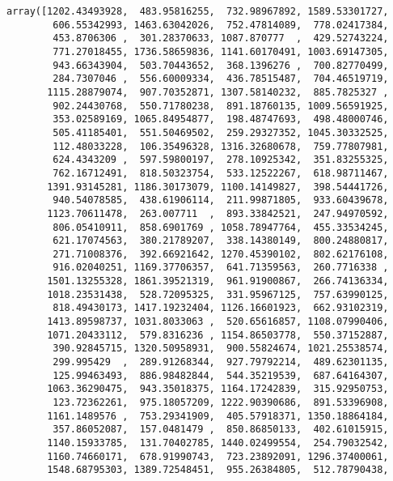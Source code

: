 \documentclass[11pt]{article}
\makeatletter
\newcommand{\boxspacing}{\kern\kvtcb@left@rule\kern\kvtcb@boxsep}
\newcommand{\prompt}[4]{
        {\ttfamily\llap{{\color{#2}[#3]:\hspace{3pt}#4}}\vspace{-\baselineskip}}
    }
\makeatother
\begin{document}
            \begin{tcolorbox}[breakable, size=fbox, boxrule=.5pt, pad at break*=1mm, opacityfill=0]
\prompt{Out}{outcolor}{174}{\boxspacing}
\begin{Verbatim}[commandchars=\\\{\}]
array([1202.43493928,  483.95816255,  732.98967892, 1589.53301727,
        606.55342993, 1463.63042026,  752.47814089,  778.02417384,
        453.8706306 ,  301.28370633, 1087.870777  ,  429.52743224,
        771.27018455, 1736.58659836, 1141.60170491, 1003.69147305,
        943.66343904,  503.70443652,  368.1396276 ,  700.82770499,
        284.7307046 ,  556.60009334,  436.78515487,  704.46519719,
       1115.28879074,  907.70352871, 1307.58140232,  885.7825327 ,
        902.24430768,  550.71780238,  891.18760135, 1009.56591925,
        353.02589169, 1065.84954877,  198.48747693,  498.48000746,
        505.41185401,  551.50469502,  259.29327352, 1045.30332525,
        112.48033228,  106.35496328, 1316.32680678,  759.77807981,
        624.4343209 ,  597.59800197,  278.10925342,  351.83255325,
        762.16712491,  818.50323754,  533.12522267,  618.98711467,
       1391.93145281, 1186.30173079, 1100.14149827,  398.54441726,
        940.54078585,  438.61906114,  211.99871805,  933.60439678,
       1123.70611478,  263.007711  ,  893.33842521,  247.94970592,
        806.05410911,  858.6901769 , 1058.78947764,  455.33534245,
        621.17074563,  380.21789207,  338.14380149,  800.24880817,
        271.71008376,  392.66921642, 1270.45390102,  802.62176108,
        916.02040251, 1169.37706357,  641.71359563,  260.7716338 ,
       1501.13255328, 1861.39521319,  961.91900867,  266.74136334,
       1018.23531438,  528.72095325,  331.95967125,  757.63990125,
        818.49430173, 1417.19232404, 1126.16601923,  662.93102319,
       1413.89598737, 1031.8033063 ,  520.65616857, 1108.07990406,
       1071.20433112,  579.8316236 , 1154.86503778,  550.37152887,
        390.92845715, 1320.50958931,  900.55824674, 1021.25538574,
        299.995429  ,  289.91268344,  927.79792214,  489.62301135,
        125.99463493,  886.98482844,  544.35219539,  687.64164307,
       1063.36290475,  943.35018375, 1164.17242839,  315.92950753,
        123.72362261,  975.18057209, 1222.90390686,  891.53396908,
       1161.1489576 ,  753.29341909,  405.57918371, 1350.18864184,
        357.86052087,  157.0481479 ,  850.86850133,  402.61015915,
       1140.15933785,  131.70402785, 1440.02499554,  254.79032542,
       1160.74660171,  678.91990743,  723.23892091, 1296.37400061,
       1548.68795303, 1389.72548451,  955.26384805,  512.78790438,

\end{Verbatim}
\end{tcolorbox}
\end{document}

